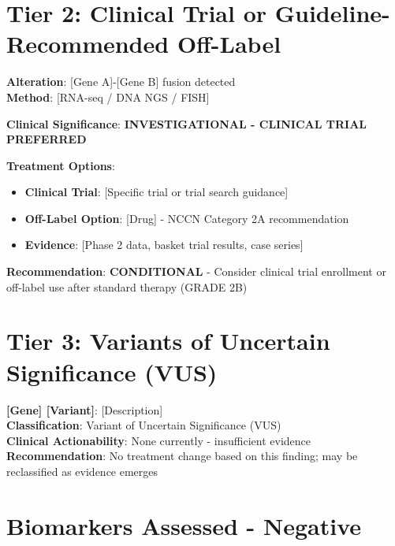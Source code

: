 \documentclass[10pt,letterpaper]{article}
\begin{document}
\section{Tier 2: Clinical Trial or Guideline-Recommended Off-Label}

\begin{tcolorbox}[enhanced,colback=tier2orange!5,colframe=tier2orange,
title={\colorbox{fusionpurple!60}{\textcolor{white}{\textbf{FUSION}}} \textbf{[Gene] Rearrangement} \hfill \textbf{TIER 2 - INVESTIGATIONAL}},
fonttitle=\bfseries\small,coltitle=black]
{\small
\textbf{Alteration}: [Gene A]-[Gene B] fusion detected\\
\textbf{Method}: [RNA-seq / DNA NGS / FISH]

\textbf{Clinical Significance}: \textcolor{tier2orange}{\textbf{INVESTIGATIONAL - CLINICAL TRIAL PREFERRED}}

\textbf{Treatment Options}:
\begin{itemize}
\item \textbf{Clinical Trial}: [Specific trial or trial search guidance]
\item \textbf{Off-Label Option}: [Drug] - NCCN Category 2A recommendation
\item \textbf{Evidence}: [Phase 2 data, basket trial results, case series]
\end{itemize}

\textbf{Recommendation}: \textbf{CONDITIONAL} - Consider clinical trial enrollment or off-label use after standard therapy (GRADE 2B)
}
\end{tcolorbox}

\section{Tier 3: Variants of Uncertain Significance (VUS)}

\begin{tcolorbox}[colback=tier3gray!10,colframe=tier3gray]
{\small
\textbf{[Gene] [Variant]}: [Description]\\
\textbf{Classification}: Variant of Uncertain Significance (VUS)\\
\textbf{Clinical Actionability}: None currently - insufficient evidence\\
\textbf{Recommendation}: No treatment change based on this finding; may be reclassified as evidence emerges
}
\end{tcolorbox}

\section{Biomarkers Assessed - Negative}
\end{document}
